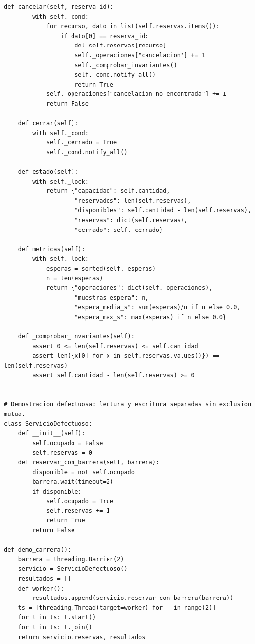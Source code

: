 \documentclass[12pt,a4paper]{article}
\begin{document}
\begin{lstlisting}[style=pycode]
    def cancelar(self, reserva_id):
        with self._cond:
            for recurso, dato in list(self.reservas.items()):
                if dato[0] == reserva_id:
                    del self.reservas[recurso]
                    self._operaciones["cancelacion"] += 1
                    self._comprobar_invariantes()
                    self._cond.notify_all()
                    return True
            self._operaciones["cancelacion_no_encontrada"] += 1
            return False

    def cerrar(self):
        with self._cond:
            self._cerrado = True
            self._cond.notify_all()

    def estado(self):
        with self._lock:
            return {"capacidad": self.cantidad,
                    "reservados": len(self.reservas),
                    "disponibles": self.cantidad - len(self.reservas),
                    "reservas": dict(self.reservas),
                    "cerrado": self._cerrado}

    def metricas(self):
        with self._lock:
            esperas = sorted(self._esperas)
            n = len(esperas)
            return {"operaciones": dict(self._operaciones),
                    "muestras_espera": n,
                    "espera_media_s": sum(esperas)/n if n else 0.0,
                    "espera_max_s": max(esperas) if n else 0.0}

    def _comprobar_invariantes(self):
        assert 0 <= len(self.reservas) <= self.cantidad
        assert len({x[0] for x in self.reservas.values()}) == len(self.reservas)
        assert self.cantidad - len(self.reservas) >= 0


# Demostracion defectuosa: lectura y escritura separadas sin exclusion mutua.
class ServicioDefectuoso:
    def __init__(self):
        self.ocupado = False
        self.reservas = 0
    def reservar_con_barrera(self, barrera):
        disponible = not self.ocupado
        barrera.wait(timeout=2)
        if disponible:
            self.ocupado = True
            self.reservas += 1
            return True
        return False

def demo_carrera():
    barrera = threading.Barrier(2)
    servicio = ServicioDefectuoso()
    resultados = []
    def worker():
        resultados.append(servicio.reservar_con_barrera(barrera))
    ts = [threading.Thread(target=worker) for _ in range(2)]
    for t in ts: t.start()
    for t in ts: t.join()
    return servicio.reservas, resultados


\end{lstlisting}
\end{document}
